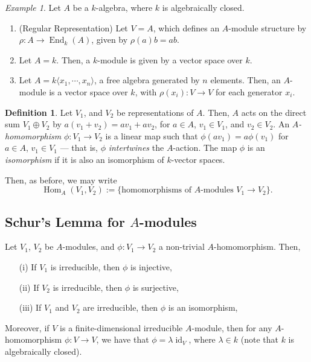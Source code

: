 \documentclass[a4paper]{report}
\theoremstyle{definition}
\newtheorem{definition}{Definition}
\theoremstyle{remark}
\theoremstyle{proposition}
\theoremstyle{conjecture}
\theoremstyle{lemma}
\theoremstyle{corollary}
\theoremstyle{exercise}
\theoremstyle{example}
\newtheorem{example}{Example}
\newcommand{\on}{\operatorname}
\begin{document}
\begin{example}
    Let $A$ be a $k$-algebra, where $k$ is algebraically closed.
    \begin{enumerate}
        \item (Regular Representation) Let $V=A$, which defines an $A$-module
            structure by $\rho : A \to \on{End}_k(A)$, given by $\rho(a)b=ab$.
        \item Let $A=k$. Then, a $k$-module is given by a vector space 
            over $k$.
        \item Let $A = k\langle x_1,\cdots,x_n\rangle$, a free algebra
            generated by $n$ elements.
            Then, an $A$-module is a vector space over $k$, 
            with $\rho(x_i) : V \to V$ for each generator $x_i$.
    \end{enumerate}
\end{example}

\begin{definition}
    Let $V_1$, and $V_2$ be representations of $A$. Then, $A$ acts on the 
    direct sum $V_1\oplus V_2$ by $a(v_1+v_2) = av_1+av_2$, for 
    $a \in A$, $v_1\in V_1$, and $v_2\in V_2$.
    An \emph{$A$-homomorphism} $\phi : V_1 \to V_2$ is a linear map 
    such that $\phi(av_1) = a\phi(v_1)$ for $a\in A$, $v_1\in V_1$ --- that is,
    $\phi$ \emph{intertwines} the $A$-action.
    The map $\phi$ is an \emph{isomorphism} if it is also an isomorphism
    of $k$-vector spaces.
\end{definition}

Then, as before, we may write 
$$\on{Hom}_A(V_1,V_2) := \lbrace \text{homomorphisms of $A$-modules $V_1\to V_2$}\rbrace.$$

\subsection{Schur's Lemma for $A$-modules}

\begin{theorem}
    Let $V_1$, $V_2$ be $A$-modules, and $\phi : V_1 \to V_2$ a non-trivial
    $A$-homomorphism. Then,
    \begin{itemize}
        \item[(i)] If $V_1$ is irreducible, then $\phi$ is injective,
        \item[(ii)] If $V_2$ is irreducible, then $\phi$ is surjective,
        \item[(iii)] If $V_1$ and $V_2$ are irreducible, then 
            $\phi$ is an isomorphism,
    \end{itemize}
    Moreover, if $V$ is a finite-dimensional irreducible $A$-module, then
    for any $A$-homomorphism $\phi : V \to V$, we have that 
    $\phi = \lambda \on{id}_V$, where $\lambda \in k$ (note that $k$ is 
    algebraically closed).
\end{theorem}
\end{document}

